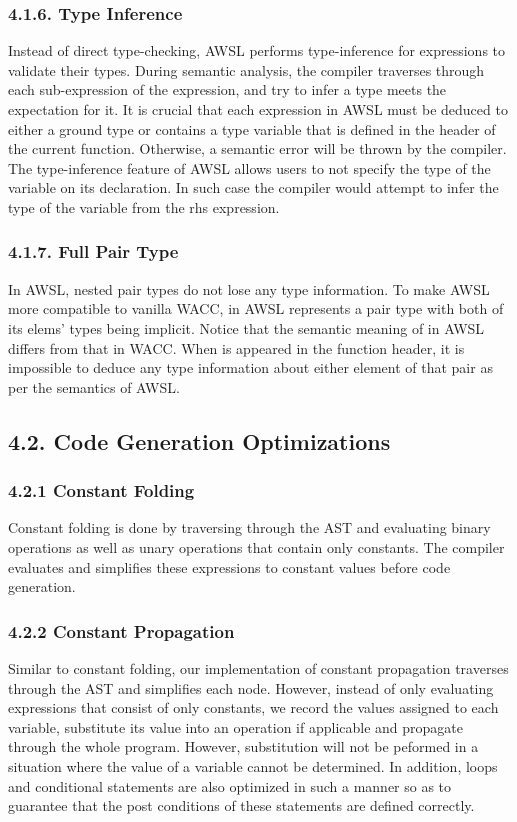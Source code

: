 \documentclass[10pt,a4paper]{report}
\begin{document}
  \subsubsection*{4.1.6. Type Inference}
  Instead of direct type-checking, AWSL performs type-inference for expressions to validate their types. During semantic analysis, the
  compiler traverses through each sub-expression of the expression, and try to infer a type meets the expectation for it. 
  It is crucial that each expression in AWSL must be deduced to either a ground type or contains a type variable that is defined in the 
  header of the current function. Otherwise, a semantic error will be thrown by the compiler.\\
  The type-inference feature of AWSL allows users to not specify the type of the variable on its declaration. In such case the compiler would 
  attempt to infer the type of the variable from the rhs expression.

  \subsubsection*{4.1.7. Full Pair Type}
  In AWSL, nested pair types do not lose any type information. To make AWSL more compatible to vanilla WACC,  in AWSL represents
  a pair type with both of its elems' types being implicit. Notice that the semantic meaning of  in AWSL differs from that in WACC. 
  When  is appeared in the function header, it is impossible to deduce any type information about either element of that pair as 
  per the semantics of AWSL.

  \subsection*{4.2. Code Generation Optimizations}
  \subsubsection*{4.2.1	Constant Folding}
  Constant folding is done by traversing through the AST and evaluating binary operations as well as unary operations that contain only constants.
  The compiler evaluates and simplifies these expressions to constant values before code generation.
  \subsubsection*{4.2.2	Constant Propagation}
  Similar to constant folding, our implementation of constant propagation traverses through the AST and simplifies each node. However, instead of 
  only evaluating expressions that consist of only constants, we record the values assigned to each variable, substitute its value into
  an operation if applicable and propagate through the whole program. However, substitution will not be peformed in a situation where the value of 
  a variable cannot be determined. In addition, loops and conditional statements are also optimized in such a manner so as to guarantee that the 
  post conditions of these statements are defined correctly.
\end{document}
